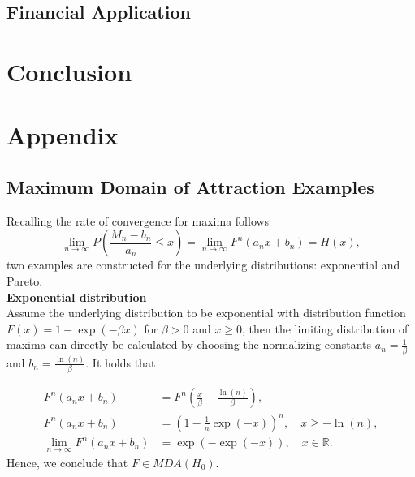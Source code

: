 \documentclass[a4paper,12pt]{article}
\theoremstyle{plain}
\begin{document}
\newpage



\subsection{Financial Application}



\section{Conclusion}

\newpage



\newpage
\appendix
\section{Appendix}
\subsection{Maximum Domain of Attraction Examples}
\label{appendixA:maximumdomain}
Recalling the rate of convergence for maxima follows 
\begin{equation}
    \lim_{n\to\infty} P\left(\frac{M_n-b_n}{a_n}\leq x\right)=\lim_{n\to\infty}F^n\left(a_nx+b_n\right)=H\left(x\right),
\end{equation}
two examples are constructed for the underlying distributions: exponential and Pareto. \\

\noindent \textbf{Exponential distribution}\\
Assume the underlying distribution to be exponential with distribution function $F\left(x\right)=1-\exp{\left(-\beta x\right)}$ for $\beta>0$ and $x \geq 0$, then the limiting distribution of maxima can directly be calculated by choosing the normalizing constants $a_n = \frac{1}{\beta}$ and $b_n=\frac{\ln{\left(n\right)}}{\beta}$. It holds that

\begin{equation}
    \begin{split}
    F^n\left(a_nx+b_n\right) &= F^n\left(\frac{x}{\beta}+\frac{\ln{\left(n\right)}}{\beta}\right),\\
    F^n\left(a_nx+b_n\right) &= \left(1-\frac{1}{n}\exp{\left(-x\right)}\right)^n, \quad x\geq-\ln{\left(n\right)}, \\
    \lim_{n\to\infty}F^n\left(a_nx+b_n\right) &= \exp{\left(-\exp{\left(-x\right)}\right)}, \quad x \in \mathbb{R}.
    \end{split}
\end{equation}
Hence, we conclude that $F\in MDA\left(H_0\right)$.\\
\end{document}
